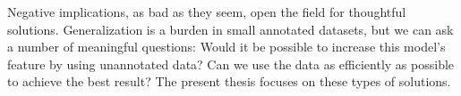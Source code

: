 Negative implications, as bad as they seem, open the field for thoughtful solutions. Generalization is a burden in small annotated datasets, but we can ask a number of meaningful questions: Would it be possible to increase this model's feature by using unannotated data? Can we use the data as efficiently as possible to achieve the best result? The present thesis focuses on these types of solutions.